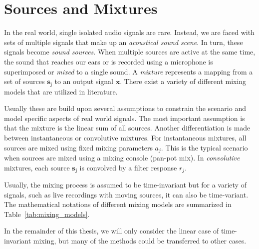 \hypertarget{sources-and-mixtures}{%
\section{Sources and Mixtures}\label{sources-and-mixtures}}

In the real world, single isolated audio signals are rare.
Instead, we are faced with sets of multiple signals that make up an \emph{acoustical sound scene}.
In turn, these signals become \emph{sound sources}.
When multiple sources are active at the same time, the sound that reaches our ears or is recorded using a microphone is superimposed or \emph{mixed} to a single sound.
A \emph{mixture} represents a mapping from a set of sources \(\mathbf{s_j}\) to an output signal \(\mathbf{x}\).
There exist a variety of different mixing models that are utilized in literature.
\par
Usually these are build upon several assumptions to constrain the scenario and model specific aspects of real world signals.
The most important assumption is that the mixture is the linear sum of all sources.
Another differentiation is made between instantaneous or convolutive mixtures.
For instantaneous mixtures, all sources are mixed using fixed mixing parameters \(a_j\).
This is the typical scenario when sources are mixed using a mixing console (pan-pot mix).
In \emph{convolutive} mixtures, each source \(\mathbf{s_j}\) is convolved by a filter response \(r_j\).
\par
Usually, the mixing process is assumed to be time-invariant but for a variety of signals, such as live recordings with moving sources, it can also be time-variant.
The mathematical notations of different mixing models are summarized in Table~\ref{tab:mixing_models}.
\par
In the remainder of this thesis, we will only consider the linear case of time-invariant mixing, but many of the methods could be transferred to other cases.


